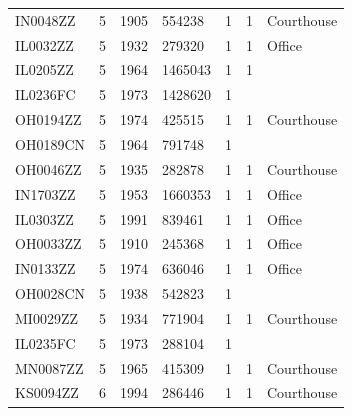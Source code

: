 \documentclass[12pt]{article}
\begin{document}
\begin{longtable}{lllllll}
IN0048ZZ         & 5      & 1905        & 554238                     & 1     & 1            & Courthouse                       \\
IL0032ZZ         & 5      & 1932        & 279320                     & 1     & 1            & Office                           \\
IL0205ZZ         & 5      & 1964        & 1465043                    & 1     & 1            &                                  \\
IL0236FC         & 5      & 1973        & 1428620                    & 1     &              &                                  \\
OH0194ZZ         & 5      & 1974        & 425515                     & 1     & 1            & Courthouse                       \\
OH0189CN         & 5      & 1964        & 791748                     & 1     &              &                                  \\
OH0046ZZ         & 5      & 1935        & 282878                     & 1     & 1            & Courthouse                       \\
IN1703ZZ         & 5      & 1953        & 1660353                    & 1     & 1            & Office                           \\
IL0303ZZ         & 5      & 1991        & 839461                     & 1     & 1            & Office                           \\
OH0033ZZ         & 5      & 1910        & 245368                     & 1     & 1            & Office                           \\
IN0133ZZ         & 5      & 1974        & 636046                     & 1     & 1            & Office                           \\
OH0028CN         & 5      & 1938        & 542823                     & 1     &              &                                  \\
MI0029ZZ         & 5      & 1934        & 771904                     & 1     & 1            & Courthouse                       \\
IL0235FC         & 5      & 1973        & 288104                     & 1     &              &                                  \\
MN0087ZZ         & 5      & 1965        & 415309                     & 1     & 1            & Courthouse                       \\
KS0094ZZ         & 6      & 1994        & 286446                     & 1     & 1            & Courthouse                       \\

\end{longtable}
\end{document}
